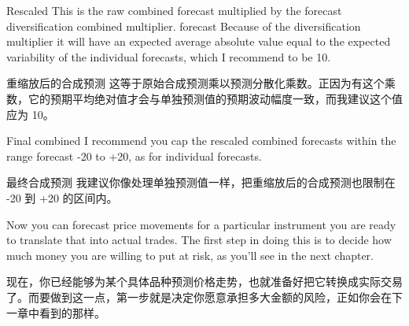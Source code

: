 \bipairgap

\begin{englishblock} Rescaled This is the raw combined forecast multiplied by the forecast diversification combined multiplier. forecast Because of the diversification multiplier it will have an expected average absolute value equal to the expected variability of the individual forecasts, which I recommend to be 10. \end{englishblock}

\begin{chineseblock}重缩放后的合成预测 这等于原始合成预测乘以预测分散化乘数。正因为有这个乘数，它的预期平均绝对值才会与单独预测值的预期波动幅度一致，而我建议这个值应为 10。 \end{chineseblock}

\bipairgap

\begin{englishblock} Final combined I recommend you cap the rescaled combined forecasts within the range forecast -20 to +20, as for individual forecasts. \end{englishblock}

\begin{chineseblock}最终合成预测 我建议你像处理单独预测值一样，把重缩放后的合成预测也限制在 -20 到 +20 的区间内。\end{chineseblock}

\bipairgap

\begin{englishblock} Now you can forecast price movements for a particular instrument you are ready to translate that into actual trades. The first step in doing this is to decide how much money you are willing to put at risk, as you'll see in the next chapter. \end{englishblock}

\begin{chineseblock}现在，你已经能够为某个具体品种预测价格走势，也就准备好把它转换成实际交易了。而要做到这一点，第一步就是决定你愿意承担多大金额的风险，正如你会在下一章中看到的那样。\end{chineseblock}
